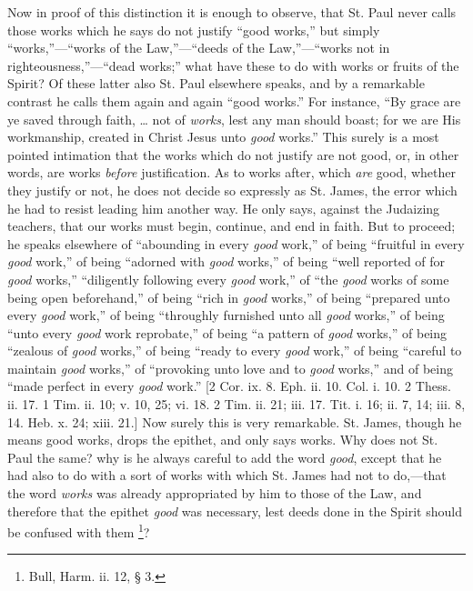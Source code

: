 Now in proof of this distinction it is enough to observe, that St.
Paul never calls those works which he says do not justify ``good
works,'' but simply ``works,''—``works of the
Law,''—``deeds of the Law,''—``works not in
righteousness,''—``dead works;'' what have these to
do with works or fruits of the Spirit? Of these latter also St.
Paul elsewhere speaks, and by a remarkable contrast he calls them
again and again ``good works.'' For instance, ``By grace
are ye saved through faith, … not of \emph{works}, lest any man
should boast; for we are His workmanship, created in Christ Jesus unto
\emph{good} works.'' This surely is a most pointed intimation that
the works which do not justify are not good, or, in other words, are
works \emph{before} justification. As to works after, which \emph{are}
good, whether they justify or not, he does not decide so expressly as
St. James, the error which he had to resist leading him another way.
He only says, against the Judaizing teachers, that our works must
begin, continue, and end in faith. But to proceed; he speaks elsewhere
of ``abounding in every \emph{good} work,'' of being
``fruitful in every \emph{good} work,'' of being ``adorned
with \emph{good} works,'' of being ``well reported of for \emph{good}
works,'' ``diligently following every \emph{good} work,''
of ``the \emph{good} works of some being open beforehand,'' of
being ``rich in \emph{good} works,'' of being ``prepared
unto every \emph{good} work,'' of being ``throughly furnished
unto all \emph{good} works,'' of being ``unto every \emph{good}
work reprobate,'' of being ``a pattern of \emph{good}
works,'' of being ``zealous of \emph{good} works,'' of
being ``ready to every \emph{good} work,'' of being
``careful to maintain \emph{good} works,'' of ``provoking
unto love and to \emph{good} works,'' and of being ``made
perfect in every \emph{good} work.'' [2 Cor. ix. 8. Eph. ii. 10.
Col. i. 10. 2 Thess. ii. 17. 1 Tim. ii. 10; v. 10, 25; vi. 18. 2 Tim.
ii. 21; iii. 17. Tit. i. 16; ii. 7, 14; iii. 8, 14. Heb. x. 24; xiii.
21.] Now surely this is very remarkable. St. James, though he means
good works, drops the epithet, and only says works. Why does not
St. Paul the same? why is he always careful to add the word \emph{good},
except that he had also to do with a sort of works with which St.
James had not to do,—that the word \emph{works} was already
appropriated by him to those of the Law, and therefore that the
epithet \emph{good} was necessary, lest deeds done in the Spirit
should be confused with them \footnote{Bull, Harm. ii. 12, § 3.}?

